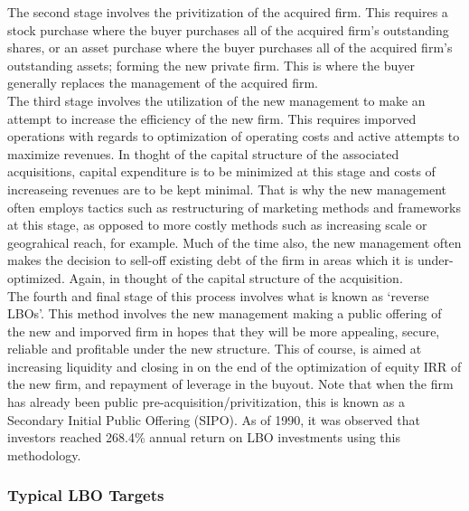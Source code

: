 \documentclass[11pt, english]{article}
\begin{document}
	The second stage involves the privitization of the acquired firm. This requires a stock purchase where the buyer purchases all of the acquired firm's outstanding shares, or an asset purchase where the buyer purchases all of the acquired firm's outstanding assets; forming the new private firm. This is where the buyer generally replaces the management of the acquired firm.\\

	The third stage involves the utilization of the new management to make an attempt to increase the efficiency of the new firm. This requires imporved operations with regards to optimization of operating costs and active attempts to maximize revenues. In thoght of the capital structure of the associated acquisitions, capital expenditure is to be minimized at this stage and costs of increaseing revenues are to be kept minimal. That is why the new management often employs tactics such as restructuring of marketing methods and frameworks at this stage, as opposed to more costly methods such as increasing scale or geograhical reach, for example. Much of the time also, the new management often makes the decision to sell-off existing debt of the firm in areas which it is under-optimized. Again, in thought of the capital structure of the acquisition.\\

	The fourth and final stage of this process involves what is known as `reverse LBOs'. This method involves the new management making a public offering of the new and imporved firm in hopes that they will be more appealing, secure, reliable and profitable under the new structure. This of course, is aimed at increasing liquidity and closing in on the end of the optimization of equity IRR of the new firm, and repayment of leverage in the buyout. Note that when the firm has already been public pre-acquisition/privitization, this is known as a Secondary Initial Public Offering (SIPO). As of 1990, it was observed that investors reached 268.4\% annual return on LBO investments using this methodology.

		\subsubsection*{Typical LBO Targets}
	
\end{document}
